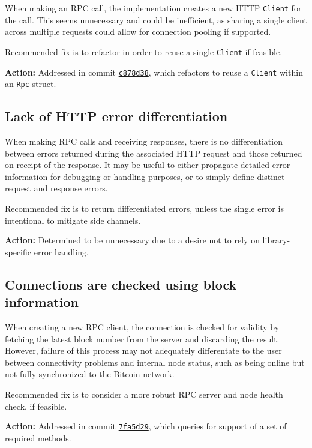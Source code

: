 \documentclass{article}
\begin{document}
When making an RPC call, the implementation creates a new HTTP \texttt{Client} for the call.
This seems unnecessary and could be inefficient, as sharing a single client across multiple requests could allow for connection pooling if supported.

Recommended fix is to refactor in order to reuse a single \texttt{Client} if feasible.

\textbf{Action:} Addressed in commit \href{https://github.com/serai-dex/serai/commit/c878d38c606e9add77ac1d1a058060accd1a51c8}{\texttt{c878d38}}, which refactors to reuse a \texttt{Client} within an \texttt{Rpc} struct.


\subsection{Lack of HTTP error differentiation}

When making RPC calls and receiving responses, there is no differentiation between errors returned during the associated HTTP request and those returned on receipt of the response.
It may be useful to either propagate detailed error information for debugging or handling purposes, or to simply define distinct request and response errors.

Recommended fix is to return differentiated errors, unless the single error is intentional to mitigate side channels.

\textbf{Action:} Determined to be unnecessary due to a desire not to rely on library-specific error handling.


\subsection{Connections are checked using block information}

When creating a new RPC client, the connection is checked for validity by fetching the latest block number from the server and discarding the result.
However, failure of this process may not adequately differentate to the user between connectivity problems and internal node status, such as being online but not fully synchronized to the Bitcoin network.

Recommended fix is to consider a more robust RPC server and node health check, if feasible.

\textbf{Action:} Addressed in commit \href{https://github.com/serai-dex/serai/commit/7fa5d291b8c60da1c26525b45f02610180bc90c8}{\texttt{7fa5d29}}, which queries for support of a set of required methods.
\end{document}
